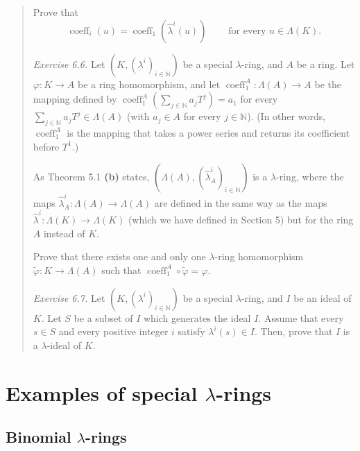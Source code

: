 \documentclass[numbers=enddot,12pt,final,onecolumn,notitlepage]{scrartcl}%
\begin{document}
\begin{quotation}
Prove that%
\[
\operatorname*{coeff}\nolimits_{i}\left(  u\right)  =\operatorname*{coeff}%
\nolimits_{1}\left(  \widehat{\lambda}^{i}\left(  u\right)  \right)
\ \ \ \ \ \ \ \ \ \ \text{for every }u\in\Lambda\left(  K\right)  .
\]


\textit{Exercise 6.6.} Let $\left(  K,\left(  \lambda^{i}\right)
_{i\in\mathbb{N}}\right)  $ be a special $\lambda$-ring, and $A$ be a ring.
Let $\varphi:K\rightarrow A$ be a ring homomorphism, and let
$\operatorname*{coeff}\nolimits_{1}^{A}:\Lambda\left(  A\right)  \rightarrow
A$ be the mapping defined by $\operatorname*{coeff}\nolimits_{1}^{A}\left(
\sum\limits_{j\in\mathbb{N}}a_{j}T^{j}\right)  =a_{1}$ for every
$\sum\limits_{j\in\mathbb{N}}a_{j}T^{j}\in\Lambda\left(  A\right)  $ (with
$a_{j}\in A$ for every $j\in\mathbb{N}$). (In other words,
$\operatorname*{coeff}\nolimits_{1}^{A}$ is the mapping that takes a power
series and returns its coefficient before $T^{1}.$)

As Theorem 5.1 \textbf{(b)} states, $\left(  \Lambda\left(  A\right)  ,\left(
\widehat{\lambda}_{A}^{i}\right)  _{i\in\mathbb{N}}\right)  $ is a $\lambda
$-ring, where the maps $\widehat{\lambda}_{A}^{i}:\Lambda\left(  A\right)
\rightarrow\Lambda\left(  A\right)  $ are defined in the same way as the maps
$\widehat{\lambda}^{i}:\Lambda\left(  K\right)  \rightarrow\Lambda\left(
K\right)  $ (which we have defined in Section 5) but for the ring $A$ instead
of $K$.

Prove that there exists one and only one $\lambda$-ring homomorphism
$\widetilde{\varphi}:K\rightarrow\Lambda\left(  A\right)  $ such that
$\operatorname*{coeff}\nolimits_{1}^{A}\circ\widetilde{\varphi}=\varphi$.

\textit{Exercise 6.7.} Let $\left(  K,\left(  \lambda^{i}\right)
_{i\in\mathbb{N}}\right)  $ be a special $\lambda$-ring, and $I$ be an ideal
of $K$. Let $S$ be a subset of $I$ which generates the ideal $I$. Assume that
every $s\in S$ and every positive integer $i$ satisfy $\lambda^{i}\left(
s\right)  \in I$. Then, prove that $I$ is a $\lambda$-ideal of $K$.
\end{quotation}

\section{Examples of special $\lambda$-rings}

\subsection{Binomial $\lambda$-rings}
\end{document}
